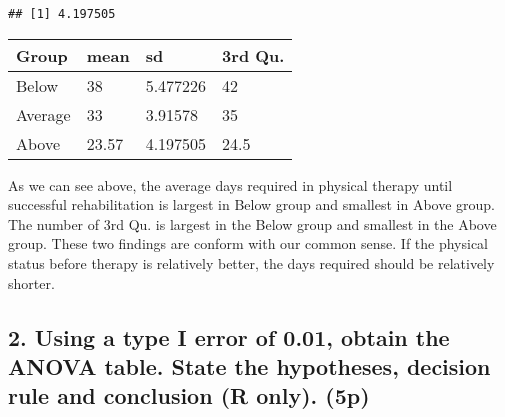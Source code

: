 \documentclass[]{article}
\newenvironment{Shaded}{\begin{snugshade}}{\end{snugshade}}
\newcommand{\KeywordTok}[1]{\textcolor[rgb]{0.13,0.29,0.53}{\textbf{#1}}}
\newcommand{\DataTypeTok}[1]{\textcolor[rgb]{0.13,0.29,0.53}{#1}}
\newcommand{\DecValTok}[1]{\textcolor[rgb]{0.00,0.00,0.81}{#1}}
\newcommand{\StringTok}[1]{\textcolor[rgb]{0.31,0.60,0.02}{#1}}
\newcommand{\OperatorTok}[1]{\textcolor[rgb]{0.81,0.36,0.00}{\textbf{#1}}}
\newcommand{\NormalTok}[1]{#1}
\begin{document}
\begin{verbatim}
## [1] 4.197505
\end{verbatim}

\begin{longtable}[]{@{}llll@{}}
\toprule
Group & mean & sd & 3rd Qu.\tabularnewline
\midrule
\endhead
Below & 38 & 5.477226 & 42\tabularnewline
Average & 33 & 3.91578 & 35\tabularnewline
Above & 23.57 & 4.197505 & 24.5\tabularnewline
\bottomrule
\end{longtable}

As we can see above, the average days required in physical therapy until
successful rehabilitation is largest in Below group and smallest in
Above group. The number of 3rd Qu. is largest in the Below group and
smallest in the Above group. These two findings are conform with our
common sense. If the physical status before therapy is relatively
better, the days required should be relatively shorter.

\subsection{2. Using a type I error of 0.01, obtain the ANOVA table.
State the hypotheses, decision rule and conclusion (R only).
(5p)}\label{using-a-type-i-error-of-0.01-obtain-the-anova-table.-state-the-hypotheses-decision-rule-and-conclusion-r-only.-5p}

\begin{Shaded}
\end{Shaded}
\end{document}
